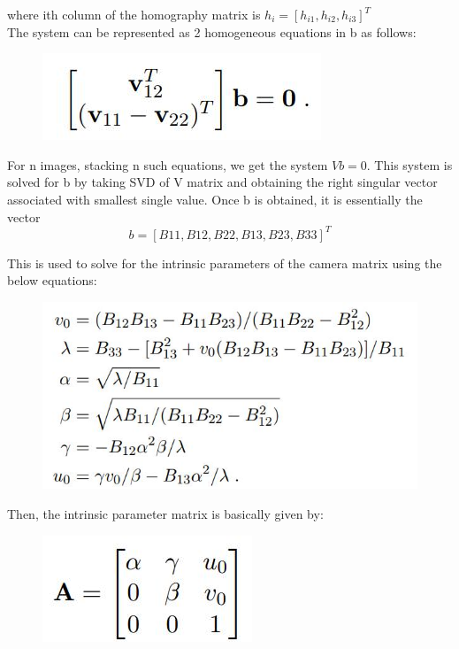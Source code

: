 \documentclass[conference]{IEEEtran}
\begin{document}
where ith column of the homography matrix is $h_i = [h_{i1}, h_{i2}, h_{i3}]^T$\\

The system can be represented as 2 homogeneous equations in b as follows:
\begin{figure}[H]
\centering
\includegraphics[scale = 0.35]{5.jpg}
\label{fig_sim}
\end{figure}

For n images, stacking n such equations, we get the system $Vb = 0$. This system is solved for b by taking SVD of V matrix and obtaining the right singular vector associated with smallest single value. Once b is obtained, it is essentially the vector $$b = [B11, B12, B22, B13, B23, B33]^T$$

This is used to solve for the intrinsic parameters of the camera matrix using the below equations:
\begin{figure}[H]
\centering
\includegraphics[scale = 0.35]{6.jpg}
\label{fig_sim}
\end{figure}

Then, the intrinsic parameter matrix is basically given by:
\begin{figure}[H]
\centering
\includegraphics[scale = 0.35]{7.jpg}
\label{fig_sim}
\end{figure}
\end{document}
